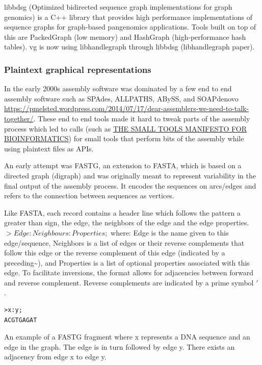 \documentclass[11pt]{article}
\begin{document}
libbdsg (Optimized bidirected sequence graph implementations for graph genomics)
is a C++ library that provides high performance implementations of sequence 
graphs for graph-based pangenomics applications. Tools built on top of this are
PackedGraph (low memory) and HashGraph (high-performance hash tables).
vg is now using libhandlegraph through libbdsg (libhandlegraph paper).

\subsubsection{Plaintext graphical representations}
\label{sec:org2c64088}
In the early 2000s assembly software was dominated by a few end to end assembly
software such as SPAdes, ALLPATHS, ABySS, and SOAPdenovo
\url{https://pmelsted.wordpress.com/2014/07/17/dear-assemblers-we-need-to-talk-together/}.
These end to end tools made it hard to tweak parts of the assembly process which
led to calls (such as \href{https://github.com/pjotrp/bioinformatics\#the-small-tools-manifesto-for-bioinformatics}{THE SMALL TOOLS MANIFESTO FOR BIOINFORMATICS}) for small
tools that perform bits of the assembly while using plaintext files as APIs.

An early attempt was FASTG,  an extension to FASTA, which is based on a directed
graph (digraph) and was originally meant to represent variability in the final
output of the assembly process.
It encodes the sequences on arcs/edges and refers to the connection
between sequences as vertices.

Like FASTA, each record contains a header line which follows the pattern
a greater than sign, the edge, the neighbors of the edge and the edge properties.
\(>Edge:Neighbours:Properties;\) where: Edge is the name given to this 
edge/sequence, Neighbors is a list of edges or their reverse complements that
follow this edge or the reverse complement of this edge
(indicated by a preceding\textasciitilde{}), and Properties is a list of optional properties 
associated with this edge. To facilitate
inversions, the format allows for adjacencies between forward and reverse
complement. Reverse complements are indicated by a prime symbol \('\)
.


\begin{verbatim}
>x:y;
ACGTGAGAT
\end{verbatim}
An example of a FASTG fragment where x represents
a DNA sequence and an edge in the graph. The edge is in turn followed by edge y. 
There exists an adjacency from edge x to edge y.
\end{document}
